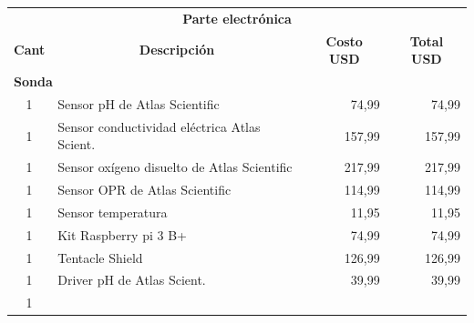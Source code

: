 \begin{table}[t]
\begin{tabular}{c l c c}
\hline
\multicolumn{4}{c}{\textbf{Parte electrónica}}  \\
\multicolumn{1}{r}{\textbf{Cant}}                 & 
\multicolumn{1}{c}{\textbf{Descripción}}           & 
\multicolumn{1}{c}{\textbf{Costo USD}}             & 
\multicolumn{1}{c}{\textbf{Total USD}} \\ 
\hline
\multicolumn{2}{l}{\textbf{Sonda}}                & 
\multicolumn{2}{c}{}                                                             \\ 
\hline
\multicolumn{1}{c}{1}                             & 
\multicolumn{1}{l}{Sensor pH de Atlas Scientific}  & 
\multicolumn{1}{r}{74,99}                          & 
\multicolumn{1}{r}{74,99}              \\ 
\multicolumn{1}{c}{1}                             & 
\multicolumn{1}{l}{Sensor conductividad eléctrica Atlas Scient.} & 
\multicolumn{1}{r}{157,99}                         & 
\multicolumn{1}{r}{157,99}             \\ 
\multicolumn{1}{c}{1}                             & 
\multicolumn{1}{l}{Sensor ox\'igeno disuelto de Atlas Scientific}    & 
\multicolumn{1}{r}{217,99}                         & 
\multicolumn{1}{r}{217,99}             \\ 
\multicolumn{1}{c}{1}                             & 
\multicolumn{1}{l}{Sensor OPR de Atlas Scientific} & 
\multicolumn{1}{r}{114,99}                         & 
\multicolumn{1}{r}{114,99}             \\ 
\multicolumn{1}{c}{1}                             & 
\multicolumn{1}{l}{Sensor temperatura}             & 
\multicolumn{1}{r}{11,95}                          & 
\multicolumn{1}{r}{11,95}              \\ 
\multicolumn{1}{c}{1}                             & 
\multicolumn{1}{l}{Kit Raspberry pi 3 B+}          & 
\multicolumn{1}{r}{74,99}                          & 
\multicolumn{1}{r}{74,99}              \\ 
\multicolumn{1}{c}{1}                             & 
\multicolumn{1}{l}{Tentacle Shield}                & 
\multicolumn{1}{r}{126,99}                         & 
\multicolumn{1}{r}{126,99}             \\ 
\multicolumn{1}{c}{1}                             & 
\multicolumn{1}{l}{Driver pH de Atlas Scient.}     & 
\multicolumn{1}{r}{39,99}                          & 
\multicolumn{1}{r}{39,99}              \\ 
\multicolumn{1}{c}{1}                             & 

\end{tabular}
\end{table}
